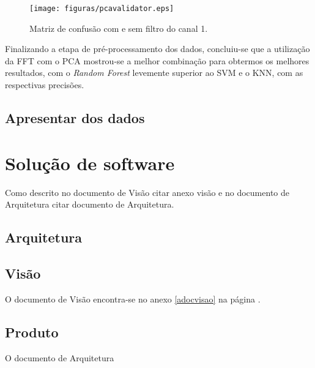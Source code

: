 \begin{figure}[!htb]
	\centering
	\texttt{[image: figuras/pcavalidator.eps]}
	\caption{Matriz de confusão com e sem filtro do canal 1.}
	\label{pcavalidator}
\end{figure}

Finalizando a etapa de pré-processamento dos dados, concluiu-se que a utilização da FFT com o PCA mostrou-se a melhor combinação para obtermos os melhores resultados, com o \textit{Random Forest} levemente superior ao SVM e o KNN, com as respectivas precisões.

\subsection{Apresentar dos dados}

\section{Solução de software}
Como descrito no documento de Visão {citar anexo visão} e no documento de Arquitetura { citar documento de Arquitetura}.
\subsection{Arquitetura}

\subsection{Visão}
O documento de Visão encontra-se no anexo \ref{adocvisao} na página \pageref{adocvisao}.

\subsection{Produto}
O documento de Arquitetura


